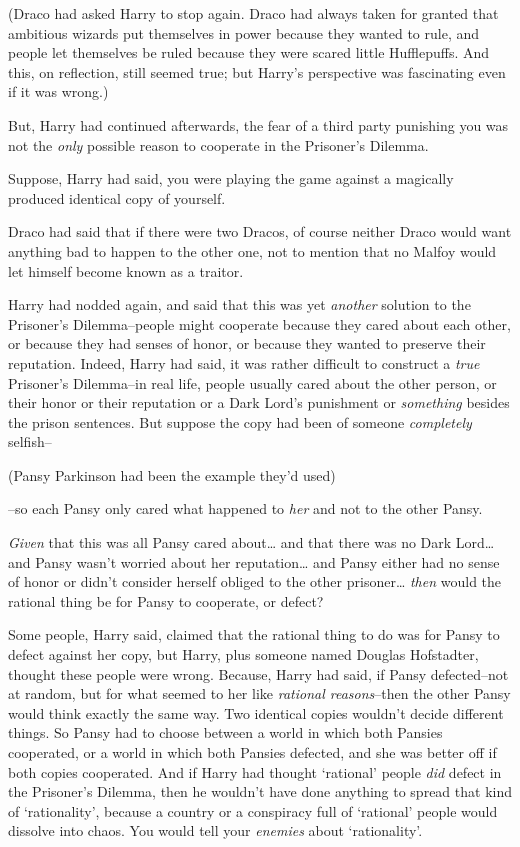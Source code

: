 (Draco had asked Harry to stop again. Draco had always taken for granted that ambitious wizards put themselves in power because they wanted to rule, and people let themselves be ruled because they were scared little Hufflepuffs. And this, on reflection, still seemed true; but Harry's perspective was fascinating even if it was wrong.)

But, Harry had continued afterwards, the fear of a third party punishing you was not the \emph{only} possible reason to cooperate in the Prisoner's Dilemma.

Suppose, Harry had said, you were playing the game against a magically produced identical copy of yourself.

Draco had said that if there were two Dracos, of course neither Draco would want anything bad to happen to the other one, not to mention that no Malfoy would let himself become known as a traitor.

Harry had nodded again, and said that this was yet \emph{another} solution to the Prisoner's Dilemma\---people might cooperate because they cared about each other, or because they had senses of honor, or because they wanted to preserve their reputation. Indeed, Harry had said, it was rather difficult to construct a \emph{true} Prisoner's Dilemma\---in real life, people usually cared about the other person, or their honor or their reputation or a Dark Lord's punishment or \emph{something} besides the prison sentences. But suppose the copy had been of someone \emph{completely} selfish\---

(Pansy Parkinson had been the example they'd used)

\---so each Pansy only cared what happened to \emph{her} and not to the other Pansy.

\emph{Given} that this was all Pansy cared about{\ldots} and that there was no Dark Lord{\ldots} and Pansy wasn't worried about her reputation{\ldots} and Pansy either had no sense of honor or didn't consider herself obliged to the other prisoner{\ldots} \emph{then} would the rational thing be for Pansy to cooperate, or defect?

Some people, Harry said, claimed that the rational thing to do was for Pansy to defect against her copy, but Harry, plus someone named Douglas Hofstadter, thought these people were wrong. Because, Harry had said, if Pansy defected\---not at random, but for what seemed to her like \emph{rational reasons}\---then the other Pansy would think exactly the same way. Two identical copies wouldn't decide different things. So Pansy had to choose between a world in which both Pansies cooperated, or a world in which both Pansies defected, and she was better off if both copies cooperated. And if Harry had thought `rational' people \emph{did} defect in the Prisoner's Dilemma, then he wouldn't have done anything to spread that kind of `rationality', because a country or a conspiracy full of `rational' people would dissolve into chaos. You would tell your \emph{enemies} about `rationality'.

